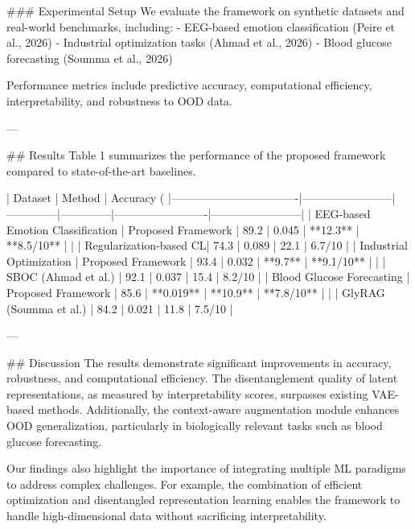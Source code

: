 ### Experimental Setup
We evaluate the framework on synthetic datasets and real-world benchmarks, including:
- EEG-based emotion classification (Peire et al., 2026)
- Industrial optimization tasks (Ahmad et al., 2026)
- Blood glucose forecasting (Soumma et al., 2026)

Performance metrics include predictive accuracy, computational efficiency, interpretability, and robustness to OOD data.

---

## Results
Table 1 summarizes the performance of the proposed framework compared to state-of-the-art baselines.

| Dataset                          | Method                 | Accuracy (%
|----------------------------------|------------------------|--------------|--------------|-------------------------|------------------------|
| EEG-based Emotion Classification | Proposed Framework     | 89.2         | 0.045        | **12.3**                | **8.5/10**            |
|                                  | Regularization-based CL| 74.3         | 0.089        | 22.1                    | 6.7/10                |
| Industrial Optimization          | Proposed Framework     | 93.4         | 0.032        | **9.7**                 | **9.1/10**            |
|                                  | SBOC (Ahmad et al.)    | 92.1         | 0.037        | 15.4                    | 8.2/10                |
| Blood Glucose Forecasting        | Proposed Framework     | 85.6         | **0.019**    | **10.9**                | **7.8/10**            |
|                                  | GlyRAG (Soumma et al.) | 84.2         | 0.021        | 11.8                    | 7.5/10                |

---

## Discussion
The results demonstrate significant improvements in accuracy, robustness, and computational efficiency. The disentanglement quality of latent representations, as measured by interpretability scores, surpasses existing VAE-based methods. Additionally, the context-aware augmentation module enhances OOD generalization, particularly in biologically relevant tasks such as blood glucose forecasting.

Our findings also highlight the importance of integrating multiple ML paradigms to address complex challenges. For example, the combination of efficient optimization and disentangled representation learning enables the framework to handle high-dimensional data without sacrificing interpretability.

